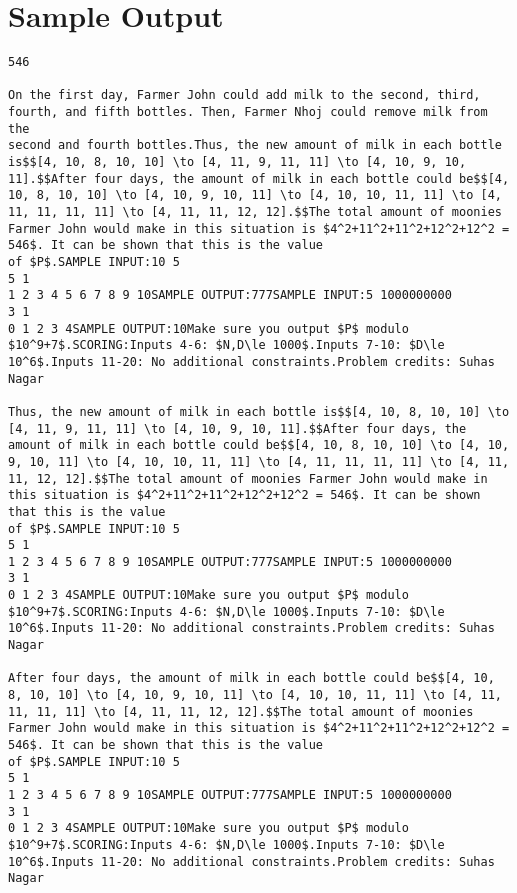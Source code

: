 \documentclass[12pt]{article}
\begin{document}
\section*{Sample Output}
\begin{verbatim}
546

On the first day, Farmer John could add milk to the second, third,
fourth, and fifth bottles. Then, Farmer Nhoj could remove milk from the
second and fourth bottles.Thus, the new amount of milk in each bottle is$$[4, 10, 8, 10, 10] \to [4, 11, 9, 11, 11] \to [4, 10, 9, 10, 11].$$After four days, the amount of milk in each bottle could be$$[4, 10, 8, 10, 10] \to [4, 10, 9, 10, 11] \to [4, 10, 10, 11, 11] \to [4, 11, 11, 11, 11] \to [4, 11, 11, 12, 12].$$The total amount of moonies Farmer John would make in this situation is $4^2+11^2+11^2+12^2+12^2 = 546$. It can be shown that this is the value
of $P$.SAMPLE INPUT:10 5
5 1
1 2 3 4 5 6 7 8 9 10SAMPLE OUTPUT:777SAMPLE INPUT:5 1000000000
3 1
0 1 2 3 4SAMPLE OUTPUT:10Make sure you output $P$ modulo $10^9+7$.SCORING:Inputs 4-6: $N,D\le 1000$.Inputs 7-10: $D\le 10^6$.Inputs 11-20: No additional constraints.Problem credits: Suhas Nagar

Thus, the new amount of milk in each bottle is$$[4, 10, 8, 10, 10] \to [4, 11, 9, 11, 11] \to [4, 10, 9, 10, 11].$$After four days, the amount of milk in each bottle could be$$[4, 10, 8, 10, 10] \to [4, 10, 9, 10, 11] \to [4, 10, 10, 11, 11] \to [4, 11, 11, 11, 11] \to [4, 11, 11, 12, 12].$$The total amount of moonies Farmer John would make in this situation is $4^2+11^2+11^2+12^2+12^2 = 546$. It can be shown that this is the value
of $P$.SAMPLE INPUT:10 5
5 1
1 2 3 4 5 6 7 8 9 10SAMPLE OUTPUT:777SAMPLE INPUT:5 1000000000
3 1
0 1 2 3 4SAMPLE OUTPUT:10Make sure you output $P$ modulo $10^9+7$.SCORING:Inputs 4-6: $N,D\le 1000$.Inputs 7-10: $D\le 10^6$.Inputs 11-20: No additional constraints.Problem credits: Suhas Nagar

After four days, the amount of milk in each bottle could be$$[4, 10, 8, 10, 10] \to [4, 10, 9, 10, 11] \to [4, 10, 10, 11, 11] \to [4, 11, 11, 11, 11] \to [4, 11, 11, 12, 12].$$The total amount of moonies Farmer John would make in this situation is $4^2+11^2+11^2+12^2+12^2 = 546$. It can be shown that this is the value
of $P$.SAMPLE INPUT:10 5
5 1
1 2 3 4 5 6 7 8 9 10SAMPLE OUTPUT:777SAMPLE INPUT:5 1000000000
3 1
0 1 2 3 4SAMPLE OUTPUT:10Make sure you output $P$ modulo $10^9+7$.SCORING:Inputs 4-6: $N,D\le 1000$.Inputs 7-10: $D\le 10^6$.Inputs 11-20: No additional constraints.Problem credits: Suhas Nagar


\end{verbatim}
\end{document}
